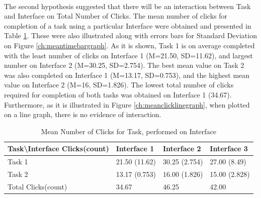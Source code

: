 \documentclass{l4proj}
\begin{document}
\paragraph{}
The second hypothesis suggested that there will be an interaction between Task and Interface on Total Number of Clicks. The mean number of clicks for completion of a task using a particular Interface were obtained and presented in Table \ref{tab:clickspertaskandinterface}. These were also illustrated along with errors bars for Standard Deviation on Figure \ref{ch:meantimebargraph}. As it is shown, Task 1 is on average completed with the least number of clicks on Interface 1 (M=21.50, SD=11.62), and largest number on Interface 2 (M=30.25, SD=2.754). The best mean value on Task 2 was also completed on Interface 1 (M=13.17, SD=0.753), and the highest mean value on Interface 2 (M=16, SD=1.826). The lowest total number of clicks required for completion of both tasks was obtained on Interface 1 (34.67). Furthermore, as it is illustrated in Figure \ref{ch:meanclicklinegraph}, when plotted on a line graph, there is no evidence of interaction. 


\begin{table}[H]
	\centering
	\begin{tabular}{|l|l|l|l|} \hline
		Task\textbackslash Interface Clicks(count)&	Interface 1	& Interface 2 &	Interface 3 \\ \hline
		Task 1 	& 21.50 (11.62)	& 30.25 (2.754)	& 27.00 (8.49)  \\ \hline
		Task 2	& 13.17 (0.753)	& 16.00 (1.826)	& 15.00 (2.828)  \\ \hline
		Total Clicks(count)	& 34.67	& 46.25 & 42.00 \\ \hline
	\end{tabular}
	\caption{Mean Number of Clicks for Task, performed on Interface}
	\label{tab:clickspertaskandinterface}
\end{table}
\end{document}
